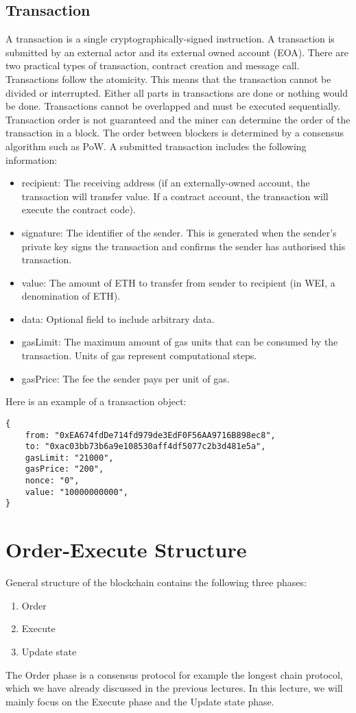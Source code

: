 \documentclass{article}
\begin{document}
\subsection*{Transaction}
A transaction is a single cryptographically-signed instruction. A transaction is submitted by an external actor and its external owned account (EOA). There are two practical types of transaction, contract creation and message call.
Transactions follow the atomicity. This means that the transaction cannot be divided or interrupted. Either all parts in transactions are done or nothing would be done. Transactions cannot be overlapped and must be executed sequentially. Transaction order is not guaranteed and the miner can determine the order of the transaction in a block. The order between blockers is determined by a consensus algorithm such as PoW. A submitted transaction includes the following information:
\begin{itemize}
  \item recipient: The receiving address (if an externally-owned account, the transaction will transfer value. If a contract account, the transaction will execute the contract code).
  \item signature: The identifier of the sender. This is generated when the sender's private key signs the transaction and confirms the sender has authorised this transaction. 
  \item value: The amount of ETH to transfer from sender to recipient (in WEI, a denomination of ETH).
  \item data: Optional field to include arbitrary data.
  \item gasLimit: The maximum amount of gas units that can be consumed by the transaction. Units of gas represent computational steps.
  \item gasPrice: The fee the sender pays per unit of gas.
\end{itemize}
Here is an example of a transaction object:
\begin{lstlisting}
{
    from: "0xEA674fdDe714fd979de3EdF0F56AA9716B898ec8",
    to: "0xac03bb73b6a9e108530aff4df5077c2b3d481e5a",
    gasLimit: "21000",
    gasPrice: "200",
    nonce: "0",
    value: "10000000000",
}
\end{lstlisting}


\section*{Order-Execute Structure}
General structure of the blockchain contains the following three phases:
\begin{enumerate}
    \item Order
    \item Execute
    \item Update state
\end{enumerate}
The Order phase is a consensus protocol for example the longest chain protocol, which we have already discussed in the previous lectures. In this lecture, we will mainly focus on the Execute phase and the Update state phase.
\end{document}
